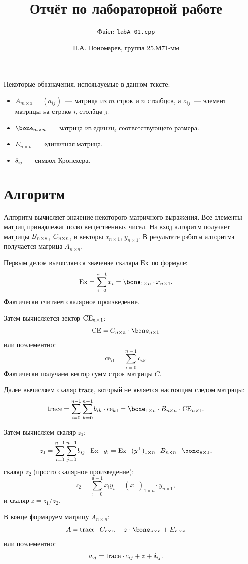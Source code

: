 \documentclass{scrartcl}
\title{Отчёт по лабораторной работе}
\subtitle{Файл: \texttt{labA\_01.cpp}}
\author{Н.А. Пономарев, группа 25.М71-мм}
\begin{document}
\maketitle

Некоторые обозначения, используемые в данном тексте:
\begin{itemize}
    \item $A_{m \times n} = (a_{ij})$~--- матрица из $m$ строк и $n$ столбцов, а $a_{ij}$~--- элемент матрицы на строке $i$, столбце $j$.
    \item $\bone_{m \times n}$~--- матрица из единиц, соответствующего размера.
    \item $E_{n \times n}$~--- единичная матрица.
    \item $\delta_{ij}$~--- символ Кронекера.
\end{itemize}

\section{Алгоритм}
\label{alg}
Алгоритм вычисляет значение некоторого матричного выражения.
Все элементы матриц принадлежат полю вещественных чисел.
На вход алгоритм получает матрицы $B_{n \times n}$, $C_{n \times n}$, и векторы $x_{n \times 1}$, $y_{n \times 1}$.
В результате работы алгоритма получается матрица $A_{n \times n}$.

Первым делом вычисляется значение скаляра $\mathrm{Ex}$ по формуле:
\[
    \Ex = \sum_{i = 0}^{n - 1} x_i = \bone_{1 \times n} \cdot x_{n \times 1}.
\]
Фактически считаем скалярное произведение.

Затем вычисляется вектор $\mathrm{CE}_{n \times 1}$:
\[
    \CE = \C \cdot \bone_{n \times 1}
\]
или поэлементно:
\[
    \mathrm{ce}_{i1} = \sum_{i = 0}^{n - 1} c_{ik}.
\]
Фактически получаем вектор сумм строк матрицы $C$.

Далее вычисляем скаляр $\mathrm{trace}$, который не является настоящим следом матрицы:
\[
    \trace = \sum_{i=0}^{n-1} \sum_{k=0}^{n-1} b_{ik} \cdot \mathrm{ce}_{k1} = \bone_{1 \times n} \cdot \B \cdot \CE_{n \times 1}.
\]

Затем вычисляем скаляр $z_1$:
\[
    z_1 = \sum_{i=0}^{n-1} \sum_{j=0}^{n-1} b_{ij} \cdot \Ex \cdot y_i = \Ex \cdot (y^\top)_{1 \times n} \cdot \B \cdot \bone_{n \times 1},
\]
скаляр $z_2$ (просто скалярное произведение):
\[
    z_2 = \sum_{i=0}^{n-1} x_i y_i = (x^\top)_{1 \times n} \cdot y_{n \times 1},
\]
и скаляр $z = z_1 / z_2$.

В конце формируем матрицу $A_{n \times n}$:
\[
    A = \trace \cdot \C + z \cdot \bone_{n \times n} + E_{n \times n}
\]
или поэлементно:
\[
    a_{ij} = \mathrm{trace} \cdot c_{ij} + z + \delta_{ij}.
\]
\end{document}

